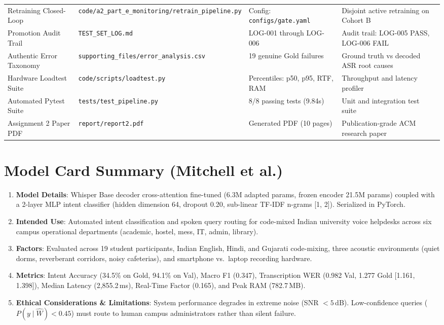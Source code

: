 \documentclass[sigconf,authordraft]{acmart}
\begin{document}
\begin{table}[t]
\begin{tabular}{llll}
    Retraining Closed-Loop & \texttt{code/a2\_part\_e\_monitoring/retrain\_pipeline.py} & Config: \texttt{configs/gate.yaml} & Disjoint active retraining on Cohort B \\
    Promotion Audit Trail & \texttt{TEST\_SET\_LOG.md} & LOG-001 through LOG-006 & Audit trail: LOG-005 PASS, LOG-006 FAIL \\
    Authentic Error Taxonomy & \texttt{supporting\_files/error\_analysis.csv} & 19 genuine Gold failures & Ground truth vs decoded ASR root causes \\
    Hardware Loadtest Suite & \texttt{code/scripts/loadtest.py} & Percentiles: p50, p95, RTF, RAM & Throughput and latency profiler \\
    Automated Pytest Suite & \texttt{tests/test\_pipeline.py} & 8/8 passing tests (9.84s) & Unit and integration test suite \\
    Assignment 2 Paper PDF & \texttt{report/report2.pdf} & Generated PDF (10 pages) & Publication-grade ACM research paper \\
    \bottomrule
  \end{tabular}
\end{table}

\section{Model Card Summary (Mitchell et al.)}
\label{app:model_card}

\begin{enumerate}
  \item \textbf{Model Details}: Whisper Base decoder cross-attention fine-tuned (6.3M adapted params, frozen encoder 21.5M params) coupled with a 2-layer MLP intent classifier (hidden dimension 64, dropout 0.20, sub-linear TF-IDF n-grams [1, 2]). Serialized in PyTorch.
  \item \textbf{Intended Use}: Automated intent classification and spoken query routing for code-mixed Indian university voice helpdesks across six campus operational departments (academic, hostel, mess, IT, admin, library).
  \item \textbf{Factors}: Evaluated across 19 student participants, Indian English, Hindi, and Gujarati code-mixing, three acoustic environments (quiet dorms, reverberant corridors, noisy cafeterias), and smartphone vs.\ laptop recording hardware.
  \item \textbf{Metrics}: Intent Accuracy (34.5\% on Gold, 94.1\% on Val), Macro F1 (0.347), Transcription WER (0.982 Val, 1.277 Gold [1.161, 1.398]), Median Latency (2,855.2\,ms), Real-Time Factor (0.165), and Peak RAM (782.7\,MB).
  \item \textbf{Ethical Considerations & Limitations}: System performance degrades in extreme noise (SNR $< 5$\,dB). Low-confidence queries ($P(y \mid \hat{W}) < 0.45$) must route to human campus administrators rather than silent failure.
\end{enumerate}
\end{document}
